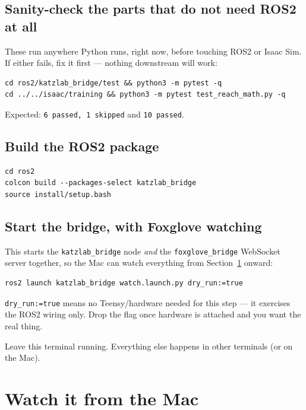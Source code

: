 \documentclass[11pt]{article}
\begin{document}
\subsection{Sanity-check the parts that do not need ROS2 at all}
These run anywhere Python runs, right now, before touching ROS2 or Isaac
Sim. If either fails, fix it first --- nothing downstream will work:

\begin{lstlisting}
cd ros2/katzlab_bridge/test && python3 -m pytest -q
cd ../../isaac/training && python3 -m pytest test_reach_math.py -q
\end{lstlisting}

Expected: \texttt{6 passed, 1 skipped} and \texttt{10 passed}.

\subsection{Build the ROS2 package}
\begin{lstlisting}
cd ros2
colcon build --packages-select katzlab_bridge
source install/setup.bash
\end{lstlisting}

\subsection{Start the bridge, with Foxglove watching}
This starts the \texttt{katzlab\_bridge} node \emph{and} the
\texttt{foxglove\_bridge} WebSocket server together, so the Mac can watch
everything from Section~\ref{sec:watch} onward:

\begin{lstlisting}
ros2 launch katzlab_bridge watch.launch.py dry_run:=true
\end{lstlisting}

\texttt{dry\_run:=true} means no Teensy/hardware needed for this step ---
it exercises the ROS2 wiring only. Drop the flag once hardware is
attached and you want the real thing.

Leave this terminal running. Everything else happens in other terminals
(or on the Mac).

\section{Watch it from the Mac}
\label{sec:watch}
\end{document}
